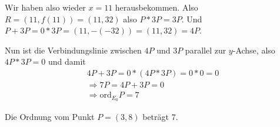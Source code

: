 \begin{enumerate}[label=\alph*)]
Wir haben also wieder $x = 11$ herausbekommen. Also $R = (11, f(11)) = (11, 32)$ also $P \ast 3P = 3P$.
Und $P + 3P = 0 \ast 3P = (11, -(-32)) = (11, 32) = 4P$.

Nun ist die Verbindungslinie zwischen $4P$ und $3P$ parallel zur $y$-Achse, also $4P \ast 3P = 0$ und damit
\begin{align}
4P + 3P = 0 \ast (4P \ast 3P) = 0 \ast 0 = 0 \\
\Rightarrow 7P = 4P + 3P = 0 \\
\Rightarrow \mathrm{ord}_{E_{0}} P = 7
\end{align}

Die Ordnung vom Punkt $P = (3, 8)$ beträgt $7$.

\end{enumerate}























